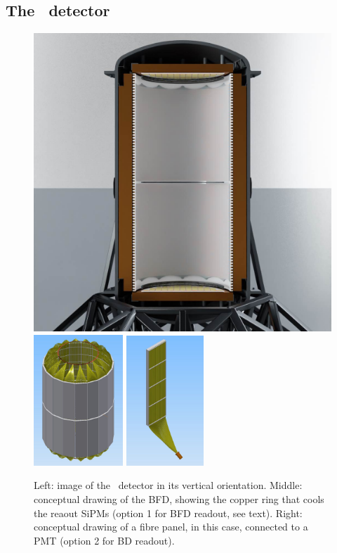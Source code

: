 \subsection{The \NHD\ detector}
\label{sec.hd}

\begin{figure}[htbp!]
\centering
    \includegraphics[width=0.42\linewidth]{img2/cut_detector.jpg}
    \includegraphics[width=0.30\textwidth]{img2/BFDSiPM.jpg}
    \includegraphics[width=0.26\textwidth]{img2/FiberPanel.jpg}
     \caption{\small Left: image of the \NHD\ detector in its vertical orientation. Middle: conceptual drawing of the BFD, showing the copper ring that cools the reaout SiPMs (option 1 for BFD readout, see text). 
     Right: conceptual drawing of  a fibre panel, in this case, connected to a PMT (option 2 for BD readout).}
     \label{fig.NHD}
\end{figure}

